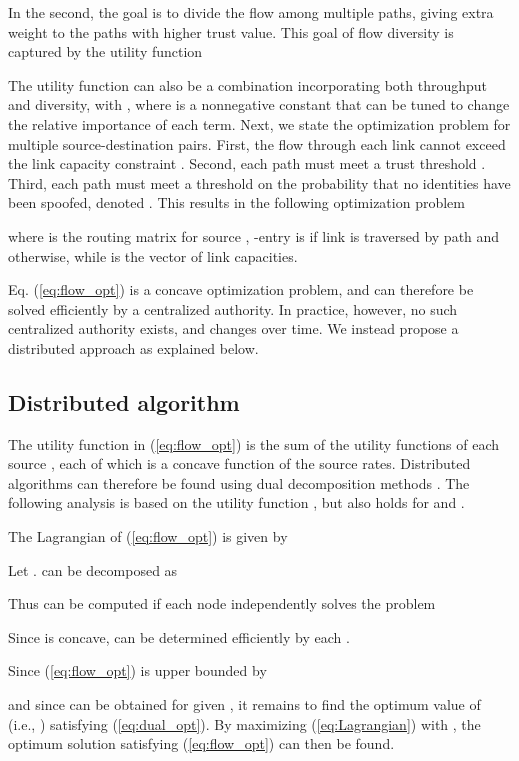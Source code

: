 \documentclass[conference]{IEEEtran}
\begin{document}
In the second, the goal is to divide the flow among multiple paths, giving extra weight to the paths with higher trust value.  This goal of flow diversity is captured by the utility function


The utility function can also be a combination incorporating both throughput and diversity, with , where  is a nonnegative constant that can be tuned to change the relative importance of each term.  Next, we state the optimization problem for multiple source-destination pairs. First, the flow through each link  cannot exceed the link capacity constraint .  Second, each path must meet a trust threshold .  Third, each path must meet a  threshold on the probability that no identities have been spoofed, denoted .  This results in the following optimization problem


where  is the routing matrix for source , -entry is  if link  is traversed by path  and  otherwise, while  is the vector of link capacities.

 Eq. (\ref{eq:flow_opt}) is a concave optimization problem, and can therefore be solved efficiently by a centralized authority.  In practice, however, no such centralized authority exists, and  changes over time.  We instead propose a distributed approach as explained below.





\subsection{Distributed algorithm}
The utility function in (\ref{eq:flow_opt}) is the sum of the utility functions of each source , each of which is a concave function of the source rates.  Distributed algorithms can therefore be found using dual decomposition methods \cite{chiang2007layering}.  The following analysis is based on the utility function , but also holds for  and .

The Lagrangian of (\ref{eq:flow_opt}) is given by


Let  .   can be decomposed as


Thus  can be computed if each node independently solves the problem

Since  is concave,  can be determined efficiently by each .

Since (\ref{eq:flow_opt}) is upper bounded by


and since  can be obtained for given , it remains to find the optimum value of  (i.e., ) satisfying (\ref{eq:dual_opt}).  By maximizing (\ref{eq:Lagrangian}) with , the optimum solution  satisfying (\ref{eq:flow_opt}) can then be found.
\end{document}
